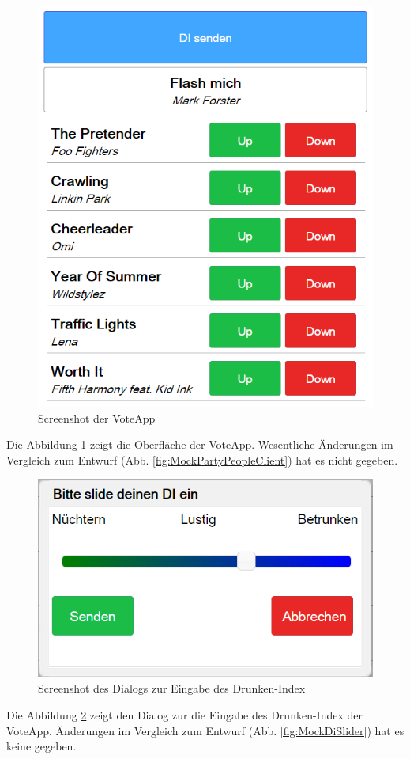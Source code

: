 \begin{figure}[H]
\centering
\includegraphics[width=0.5\linewidth]{Bilder/Screenshot-Vote-App}
\caption{Screenshot der VoteApp}
\label{fig:Screenshot-Vote-App}
\end{figure}

Die Abbildung \ref{fig:Screenshot-Vote-App} zeigt die Oberfläche der VoteApp. Wesentliche Änderungen im Vergleich zum Entwurf (Abb. \ref{fig:MockPartyPeopleClient}) hat es nicht gegeben. 

\begin{figure}[H]
\centering
\includegraphics[width=0.5\linewidth]{Bilder/Screenshot-VoteApp-DI-Slider}
\caption{Screenshot des Dialogs zur Eingabe des Drunken-Index}
\label{fig:Screenshot-Vote-App_Slider}
\end{figure}

Die Abbildung \ref{fig:Screenshot-Vote-App_Slider} zeigt den Dialog zur die Eingabe des Drunken-Index der VoteApp. Änderungen im Vergleich zum Entwurf (Abb. \ref{fig:MockDiSlider}) hat es keine gegeben.
